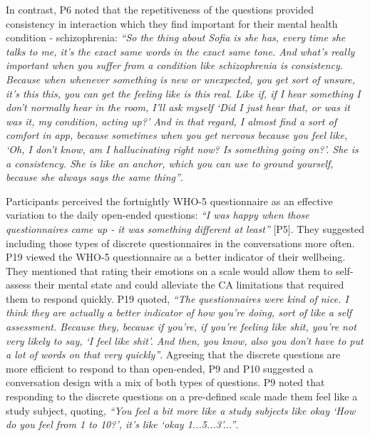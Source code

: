                 In contrast, P6 noted that the repetitiveness of the questions provided consistency in interaction which they find important for their mental health condition - schizophrenia:
                    \textit{``So the thing about Sofia is she has, every time she talks to me, it's the exact same words in the exact same tone. And what's really important when you suffer from a condition like schizophrenia is consistency. Because when whenever something is new or unexpected, you get sort of unsure, it's this this, you can get the feeling like is this real. Like if, if I hear something I don't normally hear in the room, I'll ask myself `Did I just hear that, or was it was it, my condition, acting up?' And in that regard, I almost find a sort of comfort in \acl{app}, because sometimes when you get nervous because you feel like, `Oh, I don't know, am I hallucinating right now? Is something going on?'. She is a consistency. She is like an anchor, which you can use to ground yourself, because she always says the same thing''}.
                
                Participants perceived the fortnightly \ac{WHO-5} questionnaire as an effective variation to the daily open-ended questions: 
                    \textit{``I was happy when those questionnaires came up - it was something different at least''} [P5]. 
                They suggested including those types of discrete questionnaires in the conversations more often. 
        		P19 viewed the \ac{WHO-5} questionnaire as a better indicator of their wellbeing.
        		They mentioned that rating their emotions on a scale would allow them to self-assess their mental state and could alleviate the \ac{CA} limitations that required them to respond quickly. P19 quoted, 
                    \textit{``The questionnaires were kind of nice. I think they are actually a better indicator of how you're doing, sort of like a self assessment. Because they, because if you're, if you're feeling like shit, you're not very likely to say, `I feel like shit'. And then, you know, also you don't have to put a lot of words on that very quickly''}.
                Agreeing that the discrete questions are more efficient to respond to than open-ended, P9 and P10 suggested a conversation design with a mix of both types of questions. P9 noted that responding to the discrete questions on a pre-defined scale made them feel like a study subject, quoting,
                    \textit{``You feel a bit more like a study subjects like okay `How do you feel from 1 to 10?', it's like `okay 1...5...3'...''}. 
    
